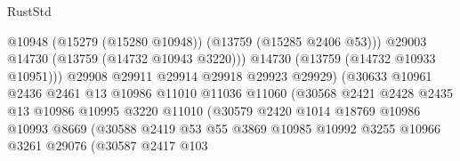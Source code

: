 \begin{lexlean}{RustStd}
\begin{coremodule}
                                            @10948
                                            (@15279 (@15280 @10948))
                                            (@13759 (@15285 @2406 @53)))
                                          @29003
                                          @14730
                                          (@13759 (@14732 @10943 @3220)))
                                        @14730
                                        (@13759 (@14732 @10933 @10951)))
                                      @29908
                                      @29911
                                      @29914
                                      @29918
                                      @29923
                                      @29929)
                                    (@30633
                                      @10961
                                      @2436
                                      @2461
                                      @13
                                      @10986
                                      @11010
                                      @11036
                                      @11060
                                      (@30568
                                        @2421
                                        @2428
                                        @2435
                                        @13
                                        @10986
                                        @10995
                                        @3220
                                        @11010
                                        (@30579
                                          @2420
                                          @1014
                                          @18769
                                          @10986
                                          @10993
                                          @8669
                                          (@30588
                                            @2419
                                            @53
                                            @55
                                            @3869
                                            @10985
                                            @10992
                                            @3255
                                            @10966
                                            @3261
                                            @29076
                                            (@30587
                                              @2417
                                              @103

\end{coremodule}
\end{lexlean}
